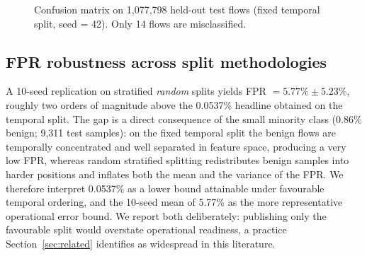 ﻿\documentclass[review,12pt]{elsarticle}
\begin{document}
\begin{figure}[!t]
\centering
{}
\caption{Confusion matrix on 1,077,798 held-out test flows (fixed temporal split, seed = 42). Only 14 flows are misclassified.}
\label{fig:confusion}
\end{figure}

\subsection{FPR robustness across split methodologies}
A 10-seed replication on stratified \emph{random} splits yields FPR $= 5.77\% \pm 5.23\%$, roughly two orders of magnitude above the 0.0537\% headline obtained on the temporal split. The gap is a direct consequence of the small minority class (0.86\% benign; 9,311 test samples): on the fixed temporal split the benign flows are temporally concentrated and well separated in feature space, producing a very low FPR, whereas random stratified splitting redistributes benign samples into harder positions and inflates both the mean and the variance of the FPR. We therefore interpret 0.0537\% as a lower bound attainable under favourable temporal ordering, and the 10-seed mean of 5.77\% as the more representative operational error bound. We report both deliberately: publishing only the favourable split would overstate operational readiness, a practice Section~\ref{sec:related} identifies as widespread in this literature.
\end{document}
